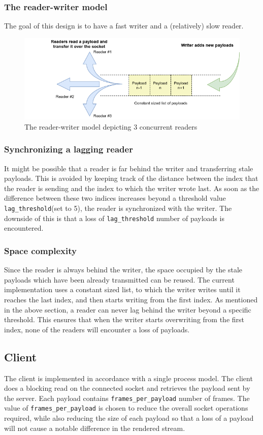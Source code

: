 \documentclass[a4paper]{article}
\begin{document}
  \subsubsection{The reader-writer model}
  The goal of this design is to have a fast writer and a (relatively) slow reader.
  \begin{figure}[h]
  \includegraphics[scale=0.5]{reader_writer.png}
  \caption{The reader-writer model depicting 3 concurrent readers}
  \end{figure}

  \subsubsection{Synchronizing a lagging reader}
  It might be possible that a reader is far behind the writer and transferring stale payloads. This is avoided by keeping track of the distance between the index that the reader is sending and the index to which the writer wrote last. As soon as the difference between these two indices increases beyond a threshold value \verb|lag_threshold|(set to 5), the reader is synchronized with the writer. The downside of this is that a loss of \verb|lag_threshold| number of payloads is encountered.

  \subsubsection{Space complexity}
  Since the reader is always behind the writer, the space occupied by the stale payloads which have been already transmitted can be reused. The current implementation uses a constant sized list, to which the writer writes until it reaches the last index, and then starts writing from the first index. As mentioned in the above section, a reader can never lag behind the writer beyond a specific threshold. This ensures that when the writer starts overwriting from the first index, none of the readers will encounter a loss of payloads.

  \subsection{Client}
  The client is implemented in accordance with a single process model. The client does a blocking read on the connected socket and retrieves the payload sent by the server. Each payload contains \verb|frames_per_payload| number of frames. The value of \verb|frames_per_payload| is chosen to reduce the overall socket operations required, while also reducing the size of each payload so that a loss of a payload will not cause a notable difference in the rendered stream.
\end{document}
